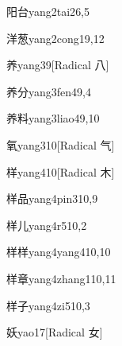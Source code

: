 \begin{entry}{阳台}{yang2tai2}{6,5}
\end{entry}

\begin{entry}{洋葱}{yang2cong1}{9,12}
\end{entry}

\begin{entry}{养}{yang3}{9}[Radical 八]
\end{entry}

\begin{entry}{养分}{yang3fen4}{9,4}
\end{entry}

\begin{entry}{养料}{yang3liao4}{9,10}
\end{entry}

\begin{entry}{氧}{yang3}{10}[Radical 气]
\end{entry}

\begin{entry}{样}{yang4}{10}[Radical 木]
\end{entry}

\begin{entry}{样品}{yang4pin3}{10,9}
\end{entry}

\begin{entry}{样儿}{yang4r5}{10,2}
\end{entry}

\begin{entry}{样样}{yang4yang4}{10,10}
\end{entry}

\begin{entry}{样章}{yang4zhang1}{10,11}
\end{entry}

\begin{entry}{样子}{yang4zi5}{10,3}
\end{entry}

\begin{entry}{妖}{yao1}{7}[Radical 女]
\end{entry}


